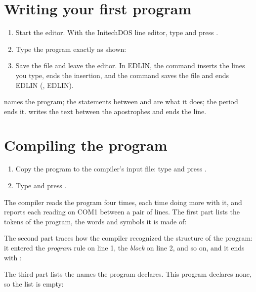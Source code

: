 \section{Writing your first program}
\begin{enumerate}
\item Start the editor.  With the InitechDOS line editor, type
   and press .
\item Type the program exactly as shown:


\item Save the file and leave the editor.  In EDLIN, the command 
  inserts the lines you type,  ends the insertion, and the
  command  saves the file and ends EDLIN (, EDLIN).
\end{enumerate}

 names the program; the statements between  and
 are what it does; the period ends it.  
writes the text between the apostrophes and ends the line.

\section{Compiling the program}
\begin{enumerate}
\item Copy the program to the compiler's input file: type
   and press .
\item Type  and press .
\end{enumerate}

The compiler reads the program four times, each time doing more with it,
and reports each reading on COM1 between a pair of lines.  The first part
lists the tokens of the program, the words and symbols it is made of:


The second part traces how the compiler recognized the structure of the
program: it entered the \textit{program} rule on line 1, the
\textit{block} on line 2, and so on, and it ends with :


The third part lists the names the program declares.  This program
declares none, so the list is empty:

